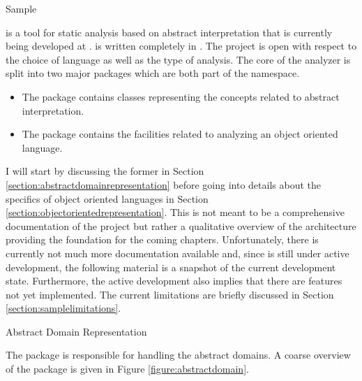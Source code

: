 \begin{chapter}{Sample}
	\label{chapter:Sample}

	\sample is a tool for static analysis based on abstract interpretation that is currently being developed at \ethz. \sample is written completely in \scala. The project is open with respect to the choice of language as well as the type of analysis. The core of the \sample analyzer is split into two major packages which are both part of the  namespace. 

	\begin{itemize}
		\item The  package contains classes representing the concepts related to abstract interpretation.
		\item The package  contains the facilities related to analyzing an object oriented language.
	\end{itemize}

	I will start by discussing the former in Section \ref{section:abstractdomainrepresentation} before going into details about the specifics of object oriented languages in Section \ref{section:objectorientedrepresentation}. This is not meant to be a comprehensive documentation of the \sample project but rather a qualitative overview of the architecture providing the foundation for the coming chapters. Unfortunately, there is currently not much more documentation available and, since \sample is still under active development, the following material is a snapshot of the current development state. Furthermore, the active development also implies that there are features not yet implemented. The current limitations are briefly discussed in Section \ref{section:samplelimitations}.


	\begin{section}{Abstract Domain Representation}
		\label{section:abstractdomainrepresentation}

		The  package is responsible for handling the abstract domains. A coarse overview of the package is given in Figure \ref{figure:abstractdomain}.
		

\end{section}
\end{chapter}
